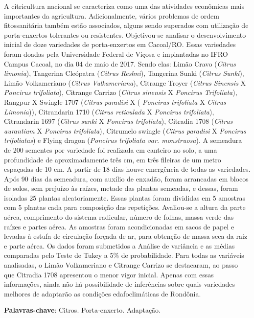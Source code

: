 \documentclass[article,12pt,onesidea,4paper,english,brazil]{abntex2}
\begin{document}
	\noindent A citricultura nacional se caracteriza como uma das atividades econômicas mais importantes da agricultura. Adicionalmente, vários problemas de ordem fitossanitária também estão associados, alguns sendo superados com utilização de porta-enxertos tolerantes ou resistentes. Objetivou-se analisar o desenvolvimento inicial de doze variedades de porta-enxertos em Cacoal/RO. Essas variedades foram doadas pela Universidade Federal de Viçosa e implantadas no IFRO Campus Cacoal, no dia 04 de maio de 2017. Sendo elas: Limão Cravo (\textit{Citrus limonia}), Tangerina Cleópatra (\textit{Citrus Reshni}), Tangerina Sunki (\textit{Citrus Sunki}), Limão Volkameriano (\textit{Citrus Vulkameriana}), Citrange Troyer (\textit{Citrus Sinensis} X \textit{Poncirus trifoliata}), Citrange Carrizo (\textit{Citrus sinensis} X \textit{Poncirus Trifoliata}), Rangpur X Swingle 1707 (\textit{Citrus paradisi} X ( \textit{Poncirus trifoliata} X \textit{Citrus Limonia})), Citrandarin 1710 (\textit{Citrus reticulada} X \textit{Poncirus trifoliata}), Citrandarin 1697 (\textit{Citrus sunki} X \textit{Poncirus trifoliata}), Citradia 1708 (\textit{Citrus aurantium} X \textit{Poncirus trifoliata}), Citrumelo swingle (\textit{Citrus paradisi} X \textit{Poncirus trifoliatas}) e Flying dragon (\textit{Poncirus trifoliata var. monstruosa}). A semeadura de 200 sementes por variedade foi realizada em canteiro no solo, a uma profundidade de aproximadamente três cm, em três fileiras de um metro espaçadas de 10 cm. A partir de 18 dias houve emergência de todas as variedades. Após 90 dias da semeadura, com auxílio de enxadão, foram arrancadas em blocos de solos, sem prejuízo às raízes, metade das plantas semeadas, e dessas, foram isoladas 25 plantas aleatoriamente. Essas plantas foram divididas em 5 amostras com 5 plantas cada para composição das repetições. Avaliou-se a altura da parte aérea, comprimento do sistema radicular, número de folhas, massa verde das raízes e partes aérea. As amostras foram acondicionadas em sacos de papel e levadas à estufa de circulação forçada de ar, para obtenção de massa seca da raiz e parte aérea. Os dados foram submetidos a Análise de variância e as médias comparadas pelo Teste de Tukey a 5\% de probabilidade. Para todas as variáveis analisadas, o Limão Volkameriano e Citrange Carrizo se destacaram, ao passo que Citradia 1708 apresentou o menor vigor inicial. Apenas com essas informações, ainda não há possibilidade de inferências sobre quais variedades melhores de adaptarão as condições edafoclimáticas de Rondônia.
	
	\vspace{\onelineskip}
	
	\noindent
	\textbf{Palavras-chave}: Citros. Porta-enxerto. Adaptação.
	
\end{document}
